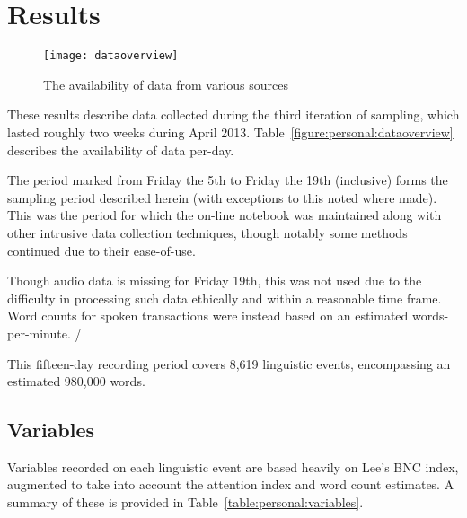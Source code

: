 \section{Results}

\begin{figure}[p]
\centering
\texttt{[image: dataoverview]}
\caption{The availability of data from various sources}
\label{fig:personal:dataoverview}
\end{figure}


These results describe data collected during the third iteration of sampling, which lasted roughly two weeks during April 2013.  Table~\ref{figure:personal:dataoverview} describes the availability of data per-day.

The period marked from Friday the 5th to Friday the 19th (inclusive) forms the sampling period described herein (with exceptions to this noted where made).  This was the period for which the on-line notebook was maintained along with other intrusive data collection techniques, though notably some methods continued due to their ease-of-use.

Though audio data is missing for Friday 19th, this was not used due to the difficulty in processing such data ethically and within a reasonable time frame.  Word counts for spoken transactions were instead based on an estimated words-per-minute.  /%

This fifteen-day recording period covers 8,619 linguistic events, encompassing an estimated 980,000 words.  



\subsection{Variables}
Variables recorded on each linguistic event are based heavily on Lee's BNC index, augmented to take into account the attention index and word count estimates.  A summary of these is provided in Table~\ref{table:personal:variables}.

